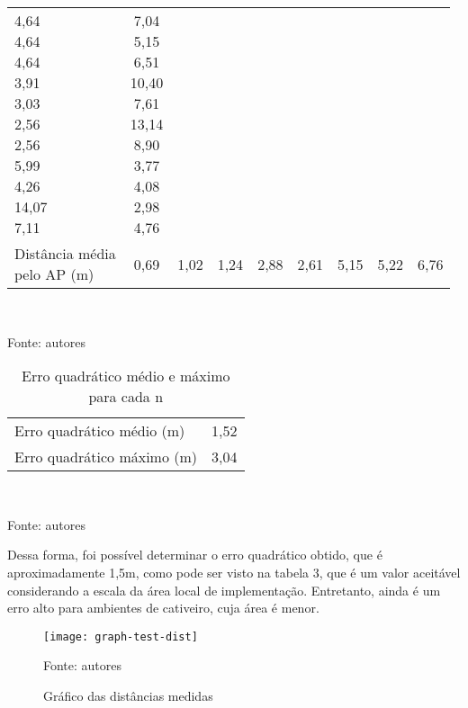 \begin{table}[ht]
\begin{tabular}{l|cccccccc}
\makecell{4,64 \\ 4,64 \\ 4,64 \\ 3,91 \\ 3,03 \\ 2,56 \\ 2,56 \\ 5,99 \\ 4,26 \\ 14,07 \\ 7,11} &
\makecell{7,04 \\ 5,15 \\ 6,51 \\ 10,40 \\ 7,61 \\ 13,14 \\ 8,90 \\ 3,77 \\ 4,08 \\ 2,98 \\ 4,76}
\vspace{0.4cm}\\

\makecell{Distância média \\ pelo AP (m)} & 0,69 & 1,02 & 1,24 & 2,88 & 2,61 & 5,15 & 5,22 & 6,76
\end{tabular}
\vspace{0.4cm}\\
\centerline{\small{Fonte: autores}}
\end{table}

\begin{table}[ht]
\centering
\caption{Erro quadrático médio e máximo para cada n}
\vspace{0.5cm}
\begin{tabular}{l|c}
\hline
Erro quadrático médio (m) & 1,52 \vspace{0.4cm}\\
Erro quadrático máximo (m) & 3,04
\end{tabular}
\vspace{0.4cm}\\
\centerline{\small{Fonte: autores}}
\end{table}

Dessa forma, foi possível determinar o erro quadrático obtido, que é aproximadamente 1,5m, como pode ser visto na tabela 3, que é um valor aceitável considerando a escala da área local de implementação. Entretanto, ainda é um erro alto para ambientes de cativeiro, cuja área é menor.

\begin{figure}[ht]
  \centering
    \caption{Gráfico das distâncias medidas}
    \texttt{[image: graph-test-dist]}
  \centerline{\small{Fonte: autores}}
\end{figure}

